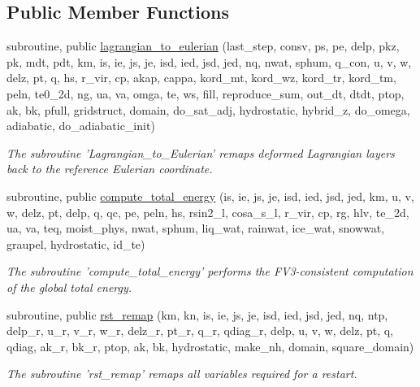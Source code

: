 \subsection*{Public Member Functions}
\begin{DoxyCompactItemize}
\item 
subroutine, public \hyperlink{classfv__mapz__mod_a0c56cad3566b5d03032b2c251925ad86}{lagrangian\-\_\-to\-\_\-eulerian} (last\-\_\-step, consv, ps, pe, delp, pkz, pk, mdt, pdt, km, is, ie, js, je, isd, ied, jsd, jed, nq, nwat, sphum, q\-\_\-con, u, v, w, delz, pt, q, hs, r\-\_\-vir, cp, akap, cappa, kord\-\_\-mt, kord\-\_\-wz, kord\-\_\-tr, kord\-\_\-tm, peln, te0\-\_\-2d, ng, ua, va, omga, te, ws, fill, reproduce\-\_\-sum, out\-\_\-dt, dtdt, ptop, ak, bk, pfull, gridstruct, domain, do\-\_\-sat\-\_\-adj, hydrostatic, hybrid\-\_\-z, do\-\_\-omega, adiabatic, do\-\_\-adiabatic\-\_\-init)
\begin{DoxyCompactList}\small\item\em The subroutine 'Lagrangian\-\_\-to\-\_\-\-Eulerian' remaps deformed Lagrangian layers back to the reference Eulerian coordinate. \end{DoxyCompactList}\item 
subroutine, public \hyperlink{classfv__mapz__mod_a9a88277aeaf10321b9ba0d0fbeaef1d9}{compute\-\_\-total\-\_\-energy} (is, ie, js, je, isd, ied, jsd, jed, km, u, v, w, delz, pt, delp, q, qc, pe, peln, hs, rsin2\-\_\-l, cosa\-\_\-s\-\_\-l, r\-\_\-vir, cp, rg, hlv, te\-\_\-2d, ua, va, teq, moist\-\_\-phys, nwat, sphum, liq\-\_\-wat, rainwat, ice\-\_\-wat, snowwat, graupel, hydrostatic, id\-\_\-te)
\begin{DoxyCompactList}\small\item\em The subroutine 'compute\-\_\-total\-\_\-energy' performs the F\-V3-\/consistent computation of the global total energy. \end{DoxyCompactList}\item 
subroutine, public \hyperlink{classfv__mapz__mod_add39354bb1bcbdf4b51fb093c045e8c1}{rst\-\_\-remap} (km, kn, is, ie, js, je, isd, ied, jsd, jed, nq, ntp, delp\-\_\-r, u\-\_\-r, v\-\_\-r, w\-\_\-r, delz\-\_\-r, pt\-\_\-r, q\-\_\-r, qdiag\-\_\-r, delp, u, v, w, delz, pt, q, qdiag, ak\-\_\-r, bk\-\_\-r, ptop, ak, bk, hydrostatic, make\-\_\-nh, domain, square\-\_\-domain)
\begin{DoxyCompactList}\small\item\em The subroutine 'rst\-\_\-remap' remaps all variables required for a restart. \end{DoxyCompactList}\item 

\end{DoxyCompactItemize}
